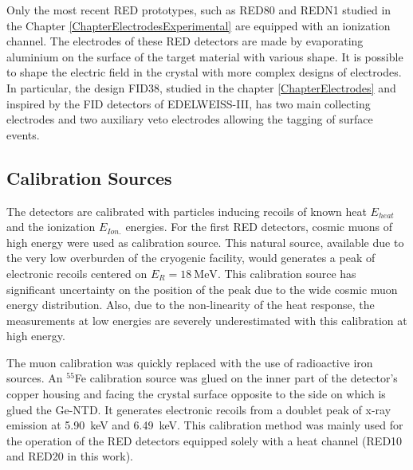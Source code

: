 Only the most recent RED prototypes, such as RED80 and REDN1 studied in the Chapter \ref{ChapterElectrodesExperimental} are equipped with an ionization channel.
The electrodes of these RED detectors are made by evaporating aluminium on the surface of the target material with various shape. It is possible to shape the electric field in the crystal with more complex designs of electrodes. In particular, the design FID38, studied in the chapter \ref{ChapterElectrodes} and inspired by the FID detectors of EDELWEISS-III, has two main collecting electrodes and two auxiliary veto electrodes allowing the tagging of surface events.





\subsection{Calibration Sources}
\label{par:calibration-source}
The detectors are calibrated with particles inducing recoils of known heat $E_{heat}$ and the ionization $E_{Ion.}$ energies.
For the first RED detectors, cosmic muons of high energy were used as calibration source. This natural source, available due to the very low overburden of the cryogenic facility, would generates a peak of electronic recoils centered on $E_R =  \SI{18}{\mega\eV}$. This calibration source has significant uncertainty on the position of the peak due to the wide cosmic muon energy distribution. Also, due to the non-linearity of the heat response, the measurements at low energies are severely underestimated with this calibration at high energy.

The muon calibration was quickly replaced with the use of radioactive iron sources.
An $^{55}$Fe calibration source was glued on the inner part of the detector's copper housing and facing the crystal surface opposite to the side on which is glued the Ge-NTD. It generates electronic recoils from a doublet peak of x-ray emission at \SI{5.90}{\kilo\eV} and \SI{6.49}{\kilo\eV}. This calibration method was mainly used for the operation of the RED detectors equipped solely with a heat channel (RED10 and RED20 in this work).

